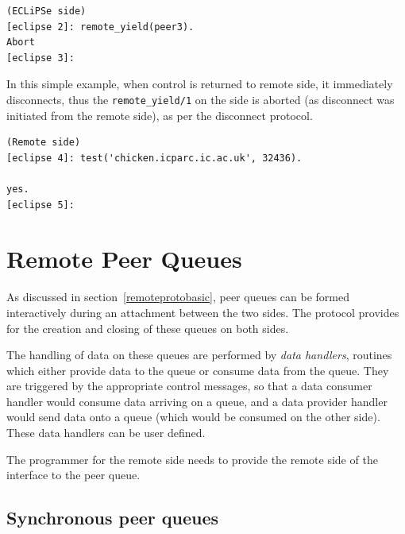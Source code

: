 \begin{verbatim}
(ECLiPSe side)
[eclipse 2]: remote_yield(peer3).
Abort
[eclipse 3]:
\end{verbatim}

In this simple example, when control is returned to remote side, it
immediately disconnects, thus the {\tt remote_yield/1} on the {\eclipse}
side is aborted (as disconnect was initiated from the remote side), as per
the disconnect protocol.

\begin{verbatim}
(Remote side)
[eclipse 4]: test('chicken.icparc.ic.ac.uk', 32436).

yes.
[eclipse 5]: 
\end{verbatim}

\section{Remote Peer Queues}

As discussed in section~\ref{remoteprotobasic}, peer queues can be formed
interactively during an attachment between the two sides. The protocol
provides for the creation and closing of these queues on both sides. 

The handling of data on these queues are performed by {\it data handlers},
routines which either provide data to the queue or consume data from the
queue. They are triggered by the appropriate control messages, so that a
data consumer handler would consume data arriving on a queue, and a data
provider handler would send data onto a queue (which would be consumed on
the other side). These data handlers can be user defined. 

The programmer for the remote side needs to provide the remote side of the
interface to the peer queue. 

\subsection{Synchronous peer queues}

